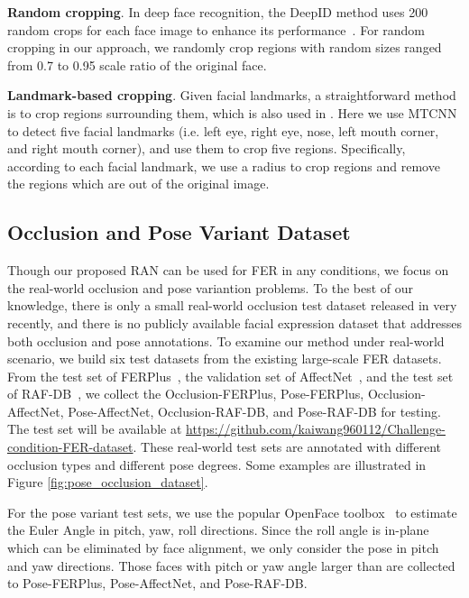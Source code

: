 \documentclass[journal]{IEEEtran}
\newcommand{\kwang}[1]{\textcolor[rgb]{0,0,0}{#1}}
\newcommand{\rpxj}[1]{\textcolor[rgb]{0,0,0}{#1}}
\newcommand{\peng}[1]{\textcolor[rgb]{0,0,0}{#1}}
\begin{document}
\textbf{Random cropping}.
In deep face recognition, the DeepID method uses 200 random crops for each face image to enhance its performance~\cite{sun2014deep}. For random cropping in our approach, we randomly crop  regions with random sizes ranged from 0.7 to 0.95 scale ratio of the original face.


\textbf{Landmark-based cropping}. Given facial landmarks, a straightforward method  is to crop regions surrounding them, which is also used in \cite{8576656}.  Here we use MTCNN to detect five facial landmarks (i.e. left eye, right eye, nose, left mouth corner, and right mouth corner), and use them to crop five regions. Specifically, according to each facial landmark, we use a radius  to crop regions and remove the regions which are out of the original image. 








\subsection{Occlusion and Pose Variant Dataset}
Though our proposed RAN can be used for FER in any conditions, we focus on the real-world occlusion and pose variantion problems. \peng{ To the best of our knowledge, there is only a small real-world occlusion test dataset released in \cite{8576656} very recently,} and there is no publicly available facial expression dataset that addresses both occlusion and pose annotations. To examine our method under real-world
scenario, \rpxj{we build six test datasets from the existing large-scale FER datasets.
From the test set of FERPlus~\cite{barsoum2016training}, the validation set of AffectNet~\cite{mollahosseini2017affectnet}, and the test set of RAF-DB~\cite{8453893}, we collect the Occlusion-FERPlus, Pose-FERPlus, Occlusion-AffectNet, Pose-AffectNet, Occlusion-RAF-DB, and Pose-RAF-DB for testing.} The test set will be available at \href{https://github.com/kaiwang960112/Challenge-condition-FER-dataset}{https://github.com/kaiwang960112/Challenge-condition-FER-dataset}.  These real-world test sets are annotated with different occlusion types and different pose degrees. Some examples are illustrated in Figure \ref{fig:pose_occlusion_dataset}.

For the pose variant test sets, we use the popular OpenFace toolbox~\cite{amos2016openface} to estimate the Euler Angle in pitch, yaw, roll directions. Since the roll angle is in-plane which can be eliminated by face alignment, we only consider the pose in pitch and yaw directions. \kwang{Those faces with pitch or yaw angle larger than  are collected to Pose-FERPlus, Pose-AffectNet, and Pose-RAF-DB.}
\end{document}
